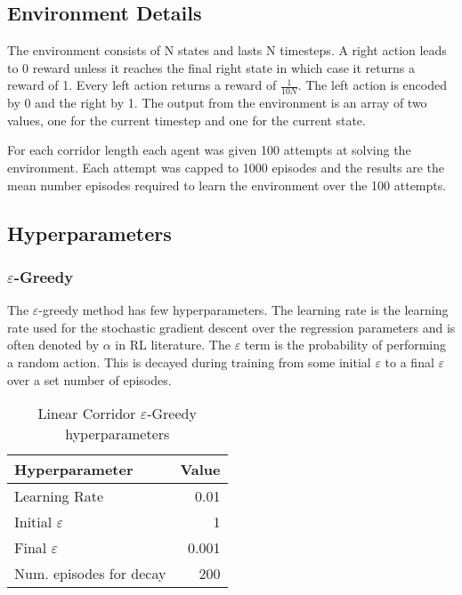 {{\subsection{Environment Details}

The environment consists of N states and lasts N timesteps. A right action leads to 0 reward unless it reaches the final right state in which case it returns a reward of 1. Every left action returns a reward of $\frac{1}{10N}$. The left action is encoded by 0 and the right by 1. The output from the environment is an array of two values, one for the current timestep and one for the current state. 

For each corridor length each agent was given 100 attempts at solving the environment. Each attempt was capped to 1000 episodes and the results are the mean number episodes required to learn the environment over the 100 attempts.

\subsection{Hyperparameters}

\subsubsection{$\varepsilon$-Greedy}

The $\varepsilon$-greedy method has few hyperparameters. The learning rate is the learning rate used for the stochastic gradient descent over the regression parameters and is often denoted by $\alpha$ in RL literature. The $\varepsilon$ term is the probability of performing a random action. This is decayed during training from some initial $\varepsilon$ to a final $\varepsilon$ over a set number of episodes.

\begin{table}[H]
    \centering
    \begin{tabular}{@{}lr@{}}
        \toprule
        Hyperparameter                     & Value \\ \midrule
        Learning Rate                      & 0.01  \\
        Initial $\varepsilon$              & 1     \\
        Final $\varepsilon$                & 0.001 \\
        Num. episodes for decay            & 200   \\ \bottomrule
    \end{tabular}
    \caption{Linear Corridor $\varepsilon$-Greedy hyperparameters}
\end{table}

}}
